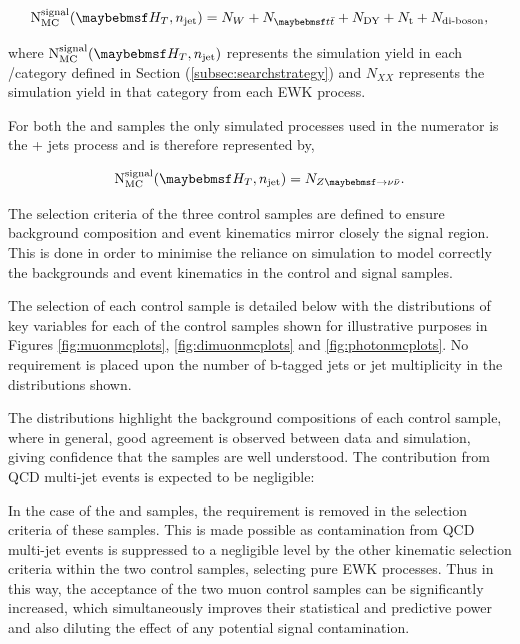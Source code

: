 \begin{equation} 
\text{N}_{\text{MC}}^{\text{signal}}(\theht,n_{\text{jet}}) = N_{W} + N_{\ttbar} + N_{\textrm{DY}} + N_{\textrm{t}} + N_{\textrm{di-boson}},
\end{equation}

where $\text{N}_{\text{MC}}^{\text{signal}}(\theht,n_{\text{jet}})$ represents the simulation yield in each \njet/\theht category defined in Section (\ref{subsec:searchstrategy}) and $N_{XX}$ represents the simulation yield in that category from each \ac{EWK} process. 

For both the \dimupjets and \gpjets samples the only simulated processes used in the numerator is the \zinv + jets process and is therefore represented by,

\begin{equation} 
\text{N}_{\text{MC}}^{\text{signal}}(\theht,n_{\text{jet}}) = N_{\zinv}.
\end{equation}


The selection criteria of the three control samples are defined to ensure background composition and event kinematics mirror closely the signal region. This is done in order to minimise the reliance on simulation to model correctly the backgrounds and event kinematics in the control and signal samples. 

The selection of each control sample is detailed below with the distributions of key variables for each of the control samples shown for illustrative purposes in Figures \ref{fig:muonmcplots}, \ref{fig:dimuonmcplots} and \ref{fig:photonmcplots}. No requirement is placed upon the number of b-tagged jets or jet multiplicity in the distributions shown. 

The distributions highlight the background compositions of each control sample, where in general, good agreement is observed between data and simulation, giving confidence that the samples are well understood. The contribution from QCD multi-jet events is expected to be negligible: 

In the case of the \mupjets and \dimupjets samples, the \alphat requirement is removed in the selection criteria of these samples. This is made possible as contamination from QCD multi-jet events is suppressed to a negligible level by the other kinematic selection criteria within the two control samples, selecting pure \ac{EWK} processes. Thus in this way, the acceptance of the two muon control samples can be significantly increased, which simultaneously improves their statistical and predictive power and also diluting the effect of any potential signal contamination. 

